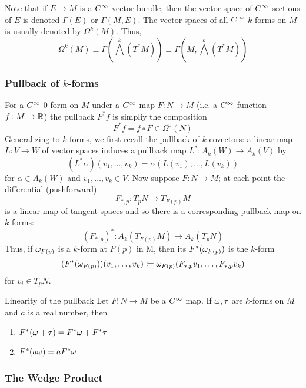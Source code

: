 Note that if \(E \rightarrow M\) is a \(C^\infty\) vector bundle, then the vector space of \(C^\infty\) sections of \(E\) is denoted \(\Gamma(E)\) or \(\Gamma(M,E)\).
The vector spaces of all \(C^\infty\) \(k\)-forms on \(M\) is usually denoted by \(\Omega^k(M)\).
Thus,
\[
    \Omega^k(M) \equiv \Gamma(\bigwedge^k (T^* M)) \equiv \Gamma(M, \bigwedge^k (T^* M))   
\]

\subsubsection{Pullback of \(k\)-forms}

For a \(C^\infty\) 0-form on \(M\) under a \(C^\infty\) map \(F \colon N \rightarrow M\) (i.e. a \(C^\infty\) function \(f \colon M \rightarrow \mathbb{R}\)) the pullback \(F^* f\) is simpliy the composition
\[
    F^* f = f \circ F \in \Omega^0 (N)    
\]
Generalizing to \(k\)-forms, we first recall the pullback of \(k\)-covectors: a linear map \(L \colon V \rightarrow W\) of vector spaces induces a pullback map \(L^* \colon A_k(W) \rightarrow A_k(V)\) by 
\[
    (L^* \alpha) (v_1, \dots, v_k) = \alpha(L(v_1), \dots, L(v_k))   
\]
for \(\alpha \in A_k (W)\) and \(v_1, \dots, v_k \in V\).
Now suppose \(F \colon N \rightarrow M\); at each point the differential (pushforward)
\[
    F_{*,p} \colon T_p N \rightarrow T_{F(p)} M
\]
is a linear map of tangent spaces and so there is a corresponding pullback map on \(k\)-forms:
\[
    (F_{*,p})^* \colon A_k(T_{F(p)}M) \rightarrow A_k (T_p N)
\]
Thus, if \(\omega_{F(p)}\) is a \(k\)-form at \(F(p)\) in M, then its  \(F^*(\omega_{F(p)})\) is the \(k\)-form 
\[
    (F^*(\omega_{F(p)}))(v_1, \dots, v_k) \coloneqq \omega_{F(p)} (F_{*,p}v_1, \dots, F_{*,p}v_k)
\]
for \(v_i \in T_p N\).
\begin{proposition}{Linearity of the pullback}{}
    Let \(F \colon N \rightarrow M\) be a \(C^\infty\) map. 
    If \(\omega, \tau\) are \(k\)-forms on \(M\) and \(a\) is a real number, then 
    \begin{enumerate}
        \item \(F^* (\omega + \tau) = F^* \omega + F^* \tau \) \\ 
        \item \(F^* (a \omega) = a F^* \omega \)
    \end{enumerate}
\end{proposition}

\subsubsection{The Wedge Product}

